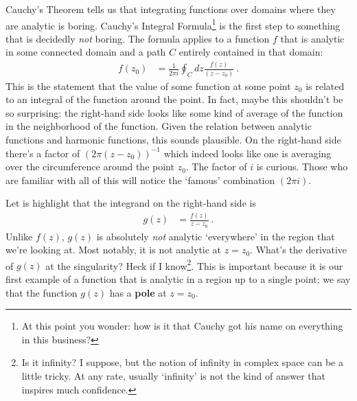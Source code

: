 Cauchy's Theorem tells us that integrating functions over domains where they are analytic is boring. Cauchy's Integral Formula\footnote{At this point you wonder: how is it that Cauchy got his name on everything in this business?} is the first step to something that is decidedly \emph{not} boring. The formula applies to a function $f$ that is analytic in some connected domain and a path $C$ entirely contained in that domain:
\begin{align}
	f(z_0) &= \frac{1}{2\pi i} \oint_C dz \frac{f(z)}{(z-z_0)}  \ .
	\label{eq:cauchy:integral}
\end{align}
This is the statement that the value of some function at some point $z_0$ is related to an integral of the function around the point. In fact, maybe this shouldn't be so surprising: the right-hand side looks like some kind of average of the function in the neighborhood of the function. Given the relation between analytic functions and harmonic functions, this sounds plausible. On the right-hand side there's a factor of $(2\pi (z-z_0))^{-1}$ which indeed looks like one is averaging over the circumference around the point $z_0$. The factor of $i$ is curious. Those who are familiar with all of this will notice the `famous' combination $(2\pi i)$.

Let is highlight that the integrand on the right-hand side is 
\begin{align}
	g(z) &= \frac{f(z)}{z-z_0} \ .
	\label{eq:g:z:cauchy:integral:theorem}
\end{align}
Unlike $f(z)$, $g(z)$ is absolutely \emph{not} analytic `everywhere' in the region that we're looking at. Most notably, it is not analytic at $z=z_0$. What's the derivative of $g(z)$ at the singularity? Heck if I know\footnote{Is it infinity? I suppose, but the notion of infinity in complex space can be a little tricky. At any rate, usually `infinity' is not the kind of answer that inspires much confidence.}. This is important because it is our first example of a function that is analytic in a region up to a single point; we say that the function $g(z)$ has a \textbf{pole} at $z=z_0$.

